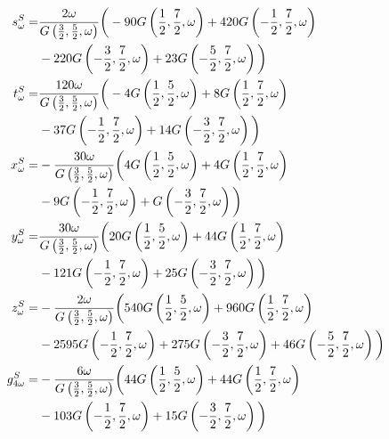 \documentclass[aps,prc,superscriptaddress,showpacs,floatfix, nofootinbib,preprintnumbers,twocolumn]{revtex4}
\begin{document}
\begin{scriptsize}
\begin{align}
s^S_{\omega }=&\frac{2 \omega}{G\left(\frac{3}{2},\frac{5}{2},\omega \right)}\bigg{(}-90 G\left(\frac{1}{2},\frac{7}{2},\omega \right)+420 G\left(-\frac{1}{2},\frac{7}{2},\omega \right)\nonumber\\
&-220 G\left(-\frac{3}{2},\frac{7}{2},\omega \right)+23 G\left(-\frac{5}{2},\frac{7}{2},\omega \right)\bigg{)}\\
t^S_{\omega }=&\frac{120 \omega}{G\left(\frac{3}{2},\frac{5}{2},\omega \right)}
\bigg{(}-4 G\left(\frac{1}{2},\frac{5}{2},\omega \right)+8 G\left(\frac{1}{2},\frac{7}{2},\omega \right)\nonumber\\
&-37 G\left(-\frac{1}{2},\frac{7}{2},\omega \right)+14 G\left(-\frac{3}{2},\frac{7}{2},\omega \right)\bigg{)}\\
x^S_{\omega }=&-\frac{30 \omega}{G\left(\frac{3}{2},\frac{5}{2},\omega \right)}\bigg{(}4 G\left(\frac{1}{2},\frac{5}{2},\omega \right)+4 G\left(\frac{1}{2},\frac{7}{2},\omega \right)\nonumber\\
&-9 G\left(-\frac{1}{2},\frac{7}{2},\omega \right)+G\left(-\frac{3}{2},\frac{7}{2},\omega \right)\bigg{)}\\
y^S_{\omega }=&\frac{30 \omega}{G\left(\frac{3}{2},\frac{5}{2},\omega \right)}\bigg{(}20 G\left(\frac{1}{2},\frac{5}{2},\omega \right)+44 G\left(\frac{1}{2},\frac{7}{2},\omega \right)\nonumber\\
&-121 G\left(-\frac{1}{2},\frac{7}{2},\omega \right)+25 G\left(-\frac{3}{2},\frac{7}{2},\omega \right)\bigg{)}\\
z^S_{\omega }=&-\frac{2 \omega}{G\left(\frac{3}{2},\frac{5}{2},\omega \right)}\bigg{(}540 G\left(\frac{1}{2},\frac{5}{2},\omega \right)+960 G\left(\frac{1}{2},\frac{7}{2},\omega \right)\nonumber\\
&-2595 G\left(-\frac{1}{2},\frac{7}{2},\omega \right)+275 G\left(-\frac{3}{2},\frac{7}{2},\omega \right)+46 G\left(-\frac{5}{2},\frac{7}{2},\omega \right)\bigg{)}\\
g^S_{4\omega }=&-\frac{6 \omega}{G\left(\frac{3}{2},\frac{5}{2},\omega \right)}\bigg{(}44 G\left(\frac{1}{2},\frac{5}{2},\omega \right)+44 G\left(\frac{1}{2},\frac{7}{2},\omega \right)\nonumber\\
&-103 G\left(-\frac{1}{2},\frac{7}{2},\omega \right)+15 G\left(-\frac{3}{2},\frac{7}{2},\omega \right)\bigg{)}
\end{align}
\end{scriptsize}
\end{document}
